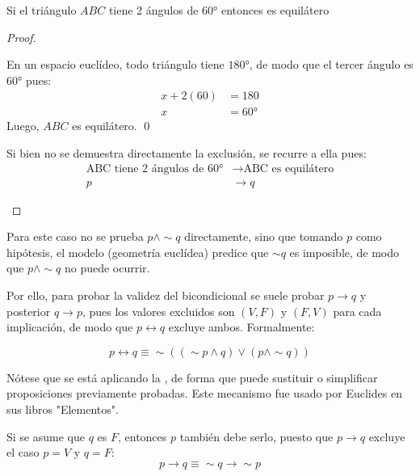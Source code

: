 \documentclass{book}
\begin{document}
  
  \begin{proposition}
    Si el triángulo $ABC$ tiene 2 ángulos de $60°$ entonces es equilátero

    \begin{proof}
      \begin{block}
        \item  En un espacio euclídeo, todo triángulo tiene $180°$, de modo que el tercer ángulo es $60°$ pues:
          \begin{align}
            x + 2(60) &= 180 \\
            x &= 60°
          \end{align}
          Luego, $ABC$ es equilátero. \qed
        
        \item Si bien no se demuestra directamente la exclusión, se recurre a ella pues:
          \begin{align}
            \text{ABC tiene 2 ángulos de } 60° & \to \text{ABC es equilátero} \\
            p & \to q
          \end{align}
      \end{block}
    \end{proof}
  \end{proposition}
  
  
  Para este caso no se prueba $p \land \sim q$ directamente, sino que tomando $p$ como
  hipótesis, el modelo (geometría euclídea) predice que $\sim q$ es imposible, de modo que
  $p \land \sim q$ no puede ocurrir.
  
  Por ello, para probar la validez del bicondicional se suele probar $p \to q$ y posterior
  $q \to p$, pues los valores excluidos son $(V,F)$ y $(F,V)$ para cada implicación, de modo
  que $p \leftrightarrow q$ excluye ambos. Formalmente:
  
  \begin{equation}
  p \leftrightarrow q \equiv \sim((\sim p \land q) \lor (p \land \sim q))
  \end{equation}
  
  Nótese que se está aplicando la
  ,
  de forma que puede sustituir o simplificar proposiciones previamente probadas.
  Este mecanismo fue usado por Euclides en sus libros "Elementos".

  \begin{definition}[title=Contraposición]
  Si se asume que $q$ es $F$, entonces $p$ también debe serlo, puesto que $p \to q$
  excluye el caso $p = V$ y $q = F$:
  \begin{equation}
  p \to q \equiv \sim q \to \sim p
  \end{equation}
  \end{definition}
  
\end{document}
